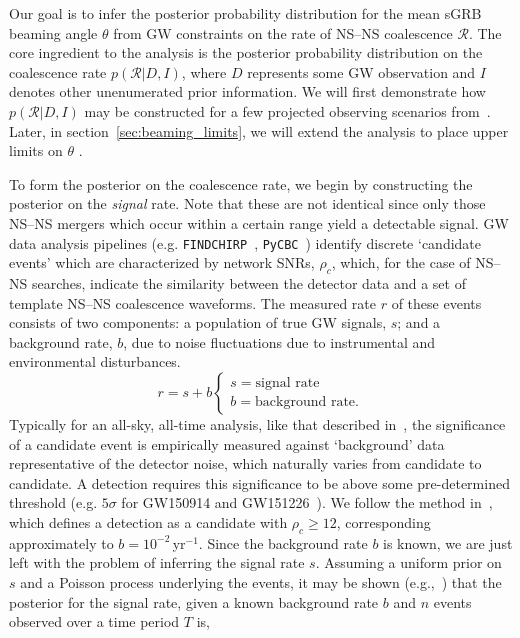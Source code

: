 \documentclass[twocolumn,nofootinbib]{revtex4-1}
\newcommand{\cbcrate}{{{\mathcal R}}}
\newcommand{\BNS}{\ac{NS}--\ac{NS}\xspace}
\newcommand{\arw}[1]{{\color{dgreen}{#1}}}
\begin{document}
Our goal is to infer the posterior probability distribution for the mean \ac{sGRB} beaming angle $\theta$ from \ac{GW} constraints on the rate of \BNS coalescence $\cbcrate$.
The core ingredient to the analysis is the posterior probability distribution on the coalescence rate $p(\cbcrate|D,I)$, where $D$ represents some \ac{GW} observation and $I$ denotes other unenumerated prior information.
We will first demonstrate how $p(\cbcrate|D,I)$ may be constructed for a few projected observing scenarios from~\cite{Aasi:2013wya}.
Later, in section~\ref{sec:beaming_limits}, we will extend the analysis to place upper limits on $\theta$ \arw{based upon the lack of detection during O1}.

To form the posterior on the coalescence rate, we begin by constructing the posterior on the \emph{signal} rate.
Note that these are not identical since only those \BNS mergers which occur within a certain range yield a detectable signal.
\ac{GW} data analysis pipelines (e.g. {\tt FINDCHIRP}~\cite{2012PhRvD..85l2006A}, {\tt PyCBC}~\cite{Canton:2014ena,Usman:2015kfa,alex_nitz_2016_197080}) identify discrete `candidate events' which are characterized by network \acp{SNR}, $\rho_c$, which, for the case of \BNS searches, indicate the similarity between the detector data and a set of template \BNS coalescence waveforms.
The measured rate $r$ of these events consists of two components: a population of true \ac{GW} signals, $s$; and a background rate, $b$, due to noise fluctuations due to instrumental and environmental disturbances.
%
\begin{equation}
r = s + b
\begin{cases}
s = \text{signal rate} \\
b = \text{background rate}.
\end{cases}
\end{equation}
%
Typically for an all-sky, all-time analysis, like that described in~\cite{Usman:2015kfa}, the significance of a candidate event is empirically measured against `background' data representative of the detector noise, which naturally varies from candidate to candidate.
A detection requires this significance to be above some pre-determined threshold (e.g. $5\sigma$ for GW150914 and GW151226~\cite{Abbott:2016blz,Abbott:2016nmj}).
We follow the method in~\cite{Aasi:2013wya}, which defines a detection as a candidate with $\rho_c \geq 12$, corresponding approximately to $b=10^{-2}$\,yr$^{-1}$.
Since the background rate $b$ is known, we are just left with the problem of inferring the signal rate $s$.
Assuming a uniform prior on $s$ and a Poisson process underlying the events, it may be shown (e.g.,~\cite{2010blda.book.....G}) that the posterior for the signal rate, given a known background rate $b$ and $n$ events observed over a time period $T$ is,
\end{document}

